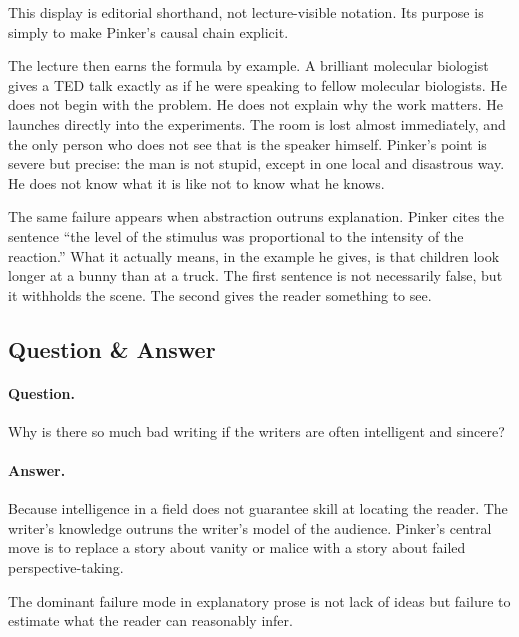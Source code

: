 \begin{remark}
This display is editorial shorthand, not lecture-visible notation. Its purpose is simply to make Pinker's causal chain explicit.
\end{remark}

The lecture then earns the formula by example. A brilliant molecular biologist gives a TED talk exactly as if he were speaking to fellow molecular biologists. He does not begin with the problem. He does not explain why the work matters. He launches directly into the experiments. The room is lost almost immediately, and the only person who does not see that is the speaker himself. Pinker's point is severe but precise: the man is not stupid, except in one local and disastrous way. He does not know what it is like not to know what he knows.

The same failure appears when abstraction outruns explanation. Pinker cites the sentence ``the level of the stimulus was proportional to the intensity of the reaction.'' What it actually means, in the example he gives, is that children look longer at a bunny than at a truck. The first sentence is not necessarily false, but it withholds the scene. The second gives the reader something to see.

\subsection{Question \& Answer}

\paragraph{Question.} Why is there so much bad writing if the writers are often intelligent and sincere?

\paragraph{Answer.} Because intelligence in a field does not guarantee skill at locating the reader. The writer's knowledge outruns the writer's model of the audience. Pinker's central move is to replace a story about vanity or malice with a story about failed perspective-taking.

\begin{proposition}
The dominant failure mode in explanatory prose is not lack of ideas but failure to estimate what the reader can reasonably infer.
\end{proposition}


